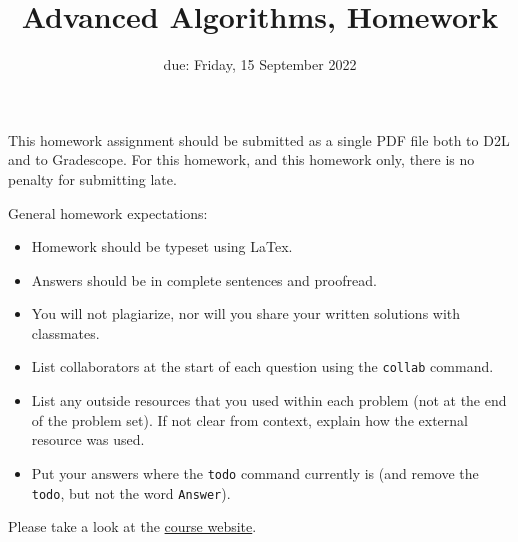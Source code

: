 \documentclass{article}
\title{Advanced Algorithms, Homework \hwnum}
\author{\todo{Your Name Here}}
\date{due: Friday, 15 September 2022}
\begin{document}
\maketitle

This homework assignment should be
submitted as a single PDF file both to D2L and to Gradescope.  For this
homework, and this homework only, there is no penalty for submitting late.

General homework expectations:
\begin{itemize}
    \item Homework should be typeset using LaTex.
    \item Answers should be in complete sentences and proofread.
    \item You will not plagiarize, nor will you share your written solutions
        with classmates.
    \item List collaborators at the start of each question using the
        \texttt{collab} command.
    \item List any outside resources that you used within each problem (not at
        the end of the problem set). If not clear from context, explain how the
        external resource was used.
    \item Put your answers where the \texttt{todo} command currently is (and
        remove the \texttt{todo}, but not the word \texttt{Answer}).
\end{itemize}


Please take a look at the \href{https://msu.github.io/csci-432-fall2023/}{course
website}.
\end{document}

